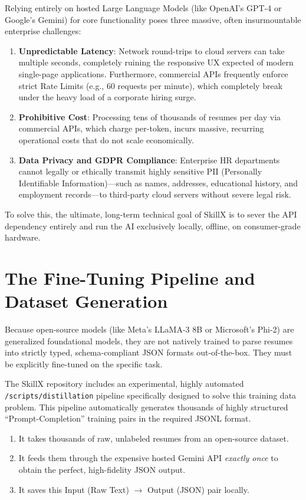 \documentclass[12pt,a4paper]{report}
\begin{document}
Relying entirely on hosted Large Language Models (like OpenAI's GPT-4 or Google's Gemini) for core functionality poses three massive, often insurmountable enterprise challenges:
\begin{enumerate}
    \item \textbf{Unpredictable Latency}: Network round-trips to cloud servers can take multiple seconds, completely ruining the responsive UX expected of modern single-page applications. Furthermore, commercial APIs frequently enforce strict Rate Limits (e.g., 60 requests per minute), which completely break under the heavy load of a corporate hiring surge.
    \item \textbf{Prohibitive Cost}: Processing tens of thousands of resumes per day via commercial APIs, which charge per-token, incurs massive, recurring operational costs that do not scale economically.
    \item \textbf{Data Privacy and GDPR Compliance}: Enterprise HR departments cannot legally or ethically transmit highly sensitive PII (Personally Identifiable Information)---such as names, addresses, educational history, and employment records---to third-party cloud servers without severe legal risk.
\end{enumerate}

To solve this, the ultimate, long-term technical goal of SkillX is to sever the API dependency entirely and run the AI exclusively locally, offline, on consumer-grade hardware.

\section{The Fine-Tuning Pipeline and Dataset Generation}

Because open-source models (like Meta's LLaMA-3 8B or Microsoft's Phi-2) are generalized foundational models, they are not natively trained to parse resumes into strictly typed, schema-compliant JSON formats out-of-the-box. They must be explicitly fine-tuned on the specific task.

The SkillX repository includes an experimental, highly automated \texttt{/scripts/distillation} pipeline specifically designed to solve this training data problem. This pipeline automatically generates thousands of highly structured ``Prompt-Completion'' training pairs in the required JSONL format. 
\begin{enumerate}
    \item It takes thousands of raw, unlabeled resumes from an open-source dataset.
    \item It feeds them through the expensive hosted Gemini API \textit{exactly once} to obtain the perfect, high-fidelity JSON output.
    \item It saves this Input (Raw Text) $\rightarrow$ Output (JSON) pair locally. 
\end{enumerate}
\end{document}
